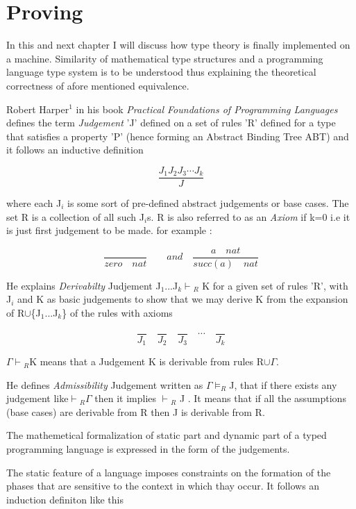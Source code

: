 \chapter{Proving}

In this and next chapter I will discuss how type theory is finally implemented on a machine. Similarity of mathematical type structures and a programming language type system is to be understood thus explaining the theoretical correctness of afore mentioned equivalence.

Robert Harper$^1$ in his book \textit{Practical Foundations of Programming Languages} defines the term \textit{Judgement} 'J' defined on a set of rules 'R' defined for a type that satisfies a property 'P' (hence forming an Abstract Binding Tree ABT) and it follows an inductive definition 

\[ \dfrac{J_1 J_2 J_3\cdots J_k}{J}\]

where each J$_i$ is some sort of pre-defined abstract judgements or base cases. The set R is a collection of all such J$_i$s. R is also referred to as an \textit{Axiom} if k=0 i.e it is just first judgement to be made. for example :

\[\dfrac{}{zero\quad nat} \quad \quad and \quad \dfrac{a\quad nat}{succ(a)\quad nat}  \]

He explains \textit{Derivabilty} Judjement J$_1$...J$_k$$\vdash$$_R$ K for a given set of rules 'R', with J$_i$ and K as basic judgements to show that we may derive K from the expansion of R$\cup$\{J$_1$...J$_k$\} of the rules with axioms 

\[ \dfrac{}{J_1} \quad \dfrac{}{J_2} \quad  \dfrac{}{J_3} \quad \cdots \quad \dfrac{}{J_k}   \]

$\Gamma\vdash$$_R$K means that a Judgement K is derivable from rules R$\cup\Gamma$.

He defines \textit{Admissibility} Judgement written as $\Gamma\models_R$J, that if there exists any judgement like$\vdash$$_R$$\Gamma$ then it implies $\vdash$$_R$ J . It means that if all the assumptions (base cases) are derivable from R then J is derivable from R.

The mathemetical formalization of static part and dynamic part of a typed programming language is expressed in the form of the judgements.

The static feature of a language imposes constraints on the formation of the phases that are sensitive to the context in which thay occur. It follows an induction definiton like this

